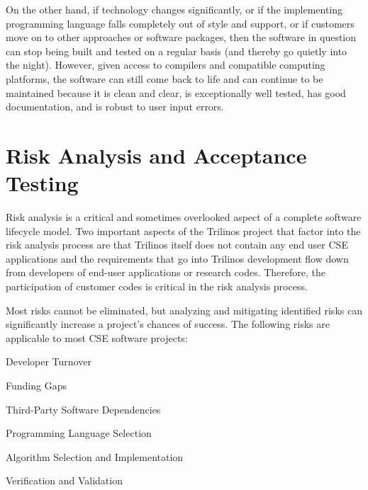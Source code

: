 \documentclass[11pt]{SANDreport}
\begin{document}
On the other hand, if technology changes significantly, or if the
implementing programming language falls completely out of style and
support, or if customers move on to other approaches or software
packages, then the software in question can stop being built and
tested on a regular basis (and thereby go quietly into the night).
However, given access to compilers and compatible computing
platforms, the software can still come back to life and can continue
to be maintained because it is clean and clear, is exceptionally well
tested, has good documentation, and is robust to user input errors.


%
{}\section{Risk Analysis and Acceptance Testing}
\label{sec:risk_analysis_acceptance_testing}
%

Risk analysis is a critical and sometimes overlooked aspect of a complete
software lifecycle model.  Two important aspects of the Trilinos project that
factor into the risk analysis process are that Trilinos itself does not
contain any end user CSE applications and the requirements that go into
Trilinos development flow down from developers of end-user applications or
research codes.  Therefore, the participation of customer codes is critical
in the risk analysis process.

Most risks cannot be eliminated, but analyzing and mitigating identified risks
can significantly increase a project's chances of success.  The following risks
are applicable to most CSE software projects:

\begin{compactitem}

{}\item Developer Turnover

{}\item Funding Gaps

{}\item Third-Party Software Dependencies

{}\item Programming Language Selection

{}\item Algorithm Selection and Implementation

{}\item Verification and Validation

\end{compactitem}
\end{document}
